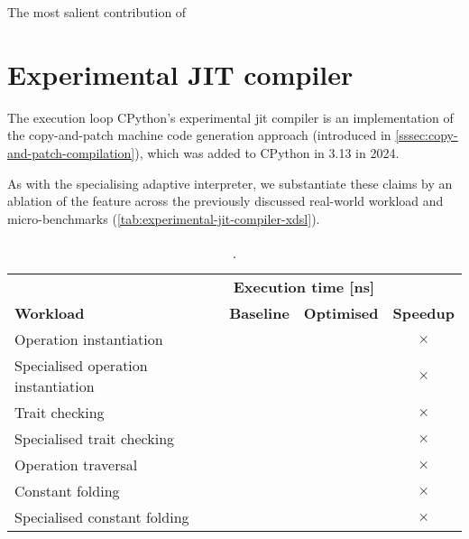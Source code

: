 The most salient contribution of


\section{Experimental JIT compiler}
\label{sec:experimental-jit-compiler}


The execution loop
CPython's experimental \ac{jit} compiler is an implementation of the copy-and-patch machine code generation approach (introduced in \autoref{sssec:copy-and-patch-compilation}), which was added to CPython in 3.13 in 2024.

As with the specialising adaptive interpreter, we substantiate these claims by an ablation of the feature across the previously discussed real-world workload and micro-benchmarks (\autoref{tab:experimental-jit-compiler-xdsl}).

\begin{table}[H]
  \caption{.}
  \label{tab:experimental-jit-compiler-xdsl}
  \centering
  \begin{tabular}{lllc}
    \toprule
    & \multicolumn{2}{c}{\textbf{Execution time [ns]}} \\
    \cmidrule(r){2-3}
    \textbf{Workload}& \textbf{Baseline} & \textbf{Optimised} & \textbf{Speedup} \\
    \midrule
    Operation instantiation & $ $ & $ $ & $\times$ \\
    Specialised operation instantiation & $ $ & $ $ & $\times$ \\
    Trait checking & $ $ & $ $ & $\times$ \\
    Specialised trait checking & $ $ & $ $ & $\times$ \\
    Operation traversal & $ $ & $ $ & $\times$ \\ %
    Constant folding & $ $ & $ $ & $\times$ \\
    Specialised constant folding & $ $ & $ $ & $\times$ \\
    \bottomrule
  \end{tabular}
\end{table}




